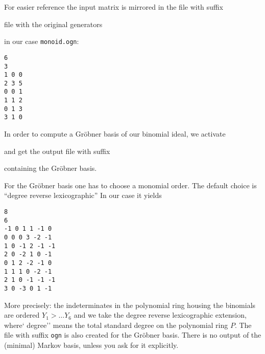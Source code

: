 For easier reference the input matrix is mirrored in the file with suffix 
\begin{itemize}
	\itemtt[ogn] file with the original generators
\end{itemize}
in our case \verb|monoid.ogn|:
\begin{Verbatim}
6
3
1 0 0 
2 3 5 
0 0 1 
1 1 2 
0 1 3 
3 1 0
\end{Verbatim}

In order to compute a Gröbner basis of our binomial ideal, we activate
\begin{itemize}
	\itemtt[GroebnerBasis]
\end{itemize}
and get the output file with suffix
\begin{itemize}
	\itemtt[grb] containing the Gröbner basis.
\end{itemize}
For the Gröbner basis one has to choose a monomial order. The default choice is ``degree reverse lexicographic'' In our case it yields
\begin{Verbatim}
8
6
-1 0 1 1 -1 0 
0 0 0 3 -2 -1 
1 0 -1 2 -1 -1 
2 0 -2 1 0 -1 
0 1 2 -2 -1 0 
1 1 1 0 -2 -1 
2 1 0 -1 -1 -1 
3 0 -3 0 1 -1 
\end{Verbatim}
More precisely: the indeterminates in the polynomial ring housing the binomials are ordered $Y_1 > \dots Y_6$ and we take the degree reverse lexicographic extension, where`  degree'' means the total standard degree on the polynomial ring $P$. The file with suffix \verb|ogn| is also created for the Gröbner basis. There is no output of the (minimal) Markov basis, unless you ask for it explicitly. 

